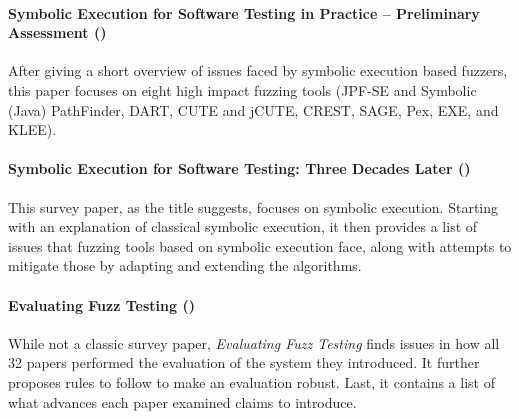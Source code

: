 \documentclass{article}
\begin{document}
\paragraph{Symbolic Execution for Software Testing in Practice – Preliminary Assessment (\citeyear{PreliminaryAssessment})}
After giving a short overview of issues faced by symbolic execution based fuzzers, this paper focuses on eight high impact fuzzing tools (JPF-SE and Symbolic (Java) PathFinder\cite{JPFSE, JavaPathFinder}, DART\cite{DART}, CUTE\cite{CUTE} and jCUTE, CREST\cite{CREST}, SAGE\cite{SAGE}, Pex\cite{Pex}, EXE\cite{EXE}, and KLEE\cite{KLEE}).

\paragraph{Symbolic Execution for Software Testing: Three Decades Later (\citeyear{ReviewThreeDecades})}
This survey paper, as the title suggests, focuses on symbolic execution. Starting with an explanation of classical symbolic execution, it then provides a list of issues that fuzzing tools based on symbolic execution face, along with attempts to mitigate those by adapting and extending the algorithms.\cite{ReviewThreeDecades}

\paragraph{Evaluating Fuzz Testing (\citeyear{ReviewThreeDecades})}
While not a classic survey paper, \textit{Evaluating Fuzz Testing} finds issues in how all 32 papers performed the evaluation of the system they introduced. It further proposes rules to follow to make an evaluation robust. Last, it contains a list of what advances each paper examined claims to introduce.\cite{EvaluatingFuzzTesting}
\end{document}
